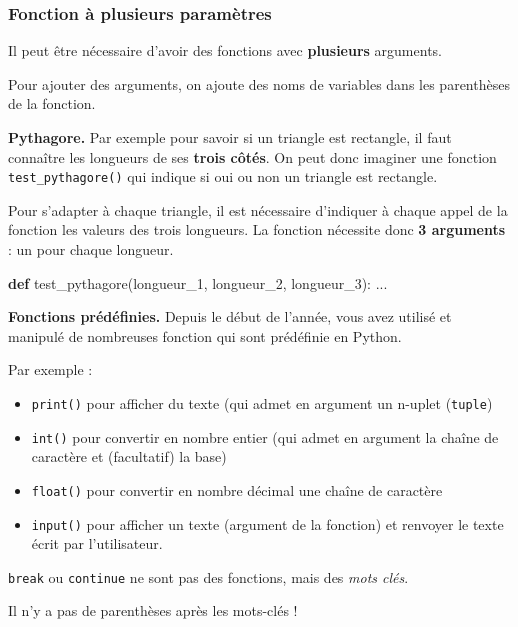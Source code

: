 \documentclass[a4paper,17pt]{extarticle}
\providecommand{\tightlist}{%
      \setlength{\itemsep}{0pt}\setlength{\parskip}{0pt}}
\newenvironment{Shaded}{}{}
\newcommand{\KeywordTok}[1]{\textcolor[rgb]{0.00,0.44,0.13}{\textbf{{#1}}}}
\newcommand{\NormalTok}[1]{{#1}}
\begin{document}
    \hypertarget{fonction-uxe0-plusieurs-paramuxe8tres}{%
\subsubsection{Fonction à plusieurs
paramètres}\label{fonction-uxe0-plusieurs-paramuxe8tres}}
\begin{retenir}
    Il peut être nécessaire d'avoir des fonctions avec \textbf{plusieurs}
arguments.

Pour ajouter des arguments, on ajoute des noms de variables dans les
parenthèses de la fonction.

        \end{retenir}\begin{exemple}
    \textbf{Pythagore.} Par exemple pour savoir si un triangle est
rectangle, il faut connaître les longueurs de ses \textbf{trois côtés}.
On peut donc imaginer une fonction \texttt{test\_pythagore()} qui
indique si oui ou non un triangle est rectangle.

Pour s'adapter à chaque triangle, il est nécessaire d'indiquer à chaque
appel de la fonction les valeurs des trois longueurs. La fonction
nécessite donc \textbf{3 arguments} : un pour chaque longueur.

\begin{Shaded}
\begin{Highlighting}[]
\KeywordTok{def}\NormalTok{ test\_pythagore(longueur\_1, longueur\_2, longueur\_3):}
\NormalTok{    ...}
\end{Highlighting}
\end{Shaded}

        \end{exemple}\begin{exemple}
    \textbf{Fonctions prédéfinies.} Depuis le début de l'année, vous avez
utilisé et manipulé de nombreuses fonction qui sont prédéfinie en
Python.

Par exemple :

\begin{itemize}
\tightlist
\item
  \texttt{print()} pour afficher du texte (qui admet en argument un
  n-uplet (\texttt{tuple})
\item
  \texttt{int()} pour convertir en nombre entier (qui admet en argument
  la chaîne de caractère et (facultatif) la base)
\item
  \texttt{float()} pour convertir en nombre décimal une chaîne de
  caractère
\item
  \texttt{input()} pour afficher un texte (argument de la fonction) et
  renvoyer le texte écrit par l'utilisateur.
\end{itemize}

        \end{exemple}\begin{remarque}
    \texttt{break} ou \texttt{continue} ne sont pas des fonctions, mais des
\emph{mots clés}.

Il n'y a pas de parenthèses après les mots-clés !

        \end{remarque}
\end{document}
